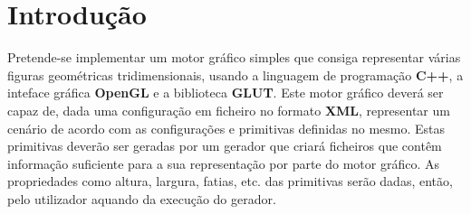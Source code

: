 \section{Introdução}
Pretende-se implementar um motor gráfico simples que consiga representar
várias figuras geométricas tridimensionais, usando a linguagem
de programação \textbf{C++}, a inteface gráfica \textbf{OpenGL} e a biblioteca \textbf{GLUT}.\newline
\break
\noindent
Este motor gráfico deverá ser capaz de, dada uma configuração em ficheiro no
formato \textbf{XML}, representar um cenário de acordo com as
configurações e primitivas definidas no mesmo.\newline
\break
\noindent
Estas primitivas deverão ser geradas por um gerador que criará ficheiros
que contêm informação suficiente para a sua representação por parte
do motor gráfico. As propriedades como altura, largura,
fatias, etc. das primitivas serão dadas, então, pelo
utilizador aquando da execução do gerador.